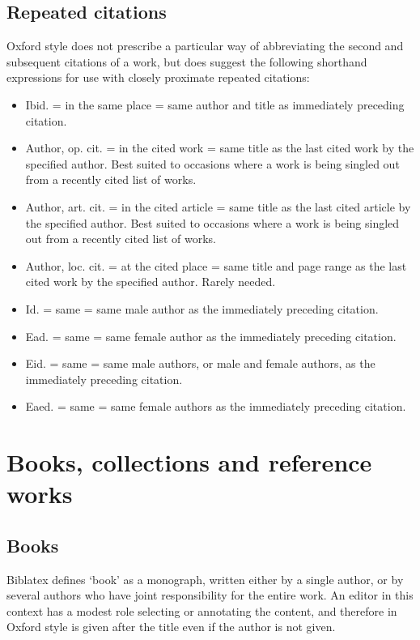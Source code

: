\documentclass[extrafontsizes,11pt,a4paper,oneside]{memoir}
\newcommand*{\code}[1]{`\textsf{#1}'}
\begin{document}
    \subsection{Repeated citations}
    
    Oxford style does not prescribe a particular way of abbreviating the second and subsequent citations of a work, but does suggest the following shorthand expressions for use with closely proximate repeated citations:
    
    \begin{itemize}
        \item Ibid. = in the same place = same author and title as immediately preceding citation.
        \item Author, op. cit. = in the cited work = same title as the last cited work by the specified author. Best suited to occasions where a work is being singled out from a recently cited list of works. 
        \item Author, art. cit. = in the cited article = same title as the last cited article by the specified author. Best suited to occasions where a work is being singled out from a recently cited list of works.
        \item Author, loc. cit. = at the cited place = same title and page range as the last cited work by the specified author. Rarely needed.
        \item Id. = same = same male author as the immediately preceding citation.
        \item Ead. = same = same female author as the immediately preceding citation.
        \item Eid. = same = same male authors, or male and female authors, as the immediately preceding citation.
        \item Eaed. = same = same female authors as the immediately preceding citation.
    \end{itemize}
    
    \section{Books, collections and reference works}\label{sec:book}
    
    \subsection{Books}
    
    Biblatex defines \code{book} as a monograph, written either by a single author, or by several authors who have joint responsibility for the entire work. An editor in this context has a modest role selecting or annotating the content, and therefore in Oxford style is given after the title even if the author is not given.
    
\end{document}
